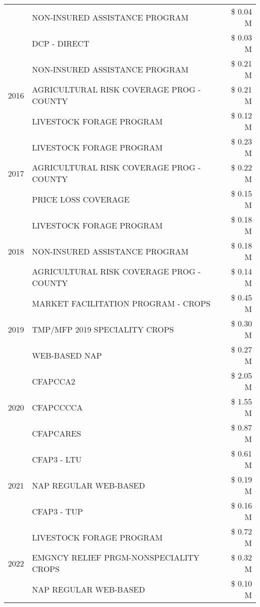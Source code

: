 \begin{tabular}{llr}
 & NON-INSURED ASSISTANCE PROGRAM & \$ 0.04 M \\
 & DCP - DIRECT & \$ 0.03 M \\
\cline{1-3}
\multirow[t]{3}{*}{2016} & NON-INSURED ASSISTANCE PROGRAM & \$ 0.21 M \\
 & AGRICULTURAL RISK COVERAGE PROG - COUNTY & \$ 0.21 M \\
 & LIVESTOCK FORAGE PROGRAM & \$ 0.12 M \\
\cline{1-3}
\multirow[t]{3}{*}{2017} & LIVESTOCK FORAGE PROGRAM & \$ 0.23 M \\
 & AGRICULTURAL RISK COVERAGE PROG - COUNTY & \$ 0.22 M \\
 & PRICE LOSS COVERAGE & \$ 0.15 M \\
\cline{1-3}
\multirow[t]{3}{*}{2018} & LIVESTOCK FORAGE PROGRAM & \$ 0.18 M \\
 & NON-INSURED ASSISTANCE PROGRAM & \$ 0.18 M \\
 & AGRICULTURAL RISK COVERAGE PROG - COUNTY & \$ 0.14 M \\
\cline{1-3}
\multirow[t]{3}{*}{2019} & MARKET FACILITATION PROGRAM - CROPS & \$ 0.45 M \\
 & TMP/MFP 2019 SPECIALITY CROPS & \$ 0.30 M \\
 & WEB-BASED NAP & \$ 0.27 M \\
\cline{1-3}
\multirow[t]{3}{*}{2020} & CFAPCCA2 & \$ 2.05 M \\
 & CFAPCCCCA & \$ 1.55 M \\
 & CFAPCARES & \$ 0.87 M \\
\cline{1-3}
\multirow[t]{3}{*}{2021} & CFAP3 - LTU & \$ 0.61 M \\
 & NAP REGULAR WEB-BASED & \$ 0.19 M \\
 & CFAP3 - TUP & \$ 0.16 M \\
\cline{1-3}
\multirow[t]{3}{*}{2022} & LIVESTOCK FORAGE PROGRAM & \$ 0.72 M \\
 & EMGNCY RELIEF PRGM-NONSPECIALITY CROPS & \$ 0.32 M \\
 & NAP REGULAR WEB-BASED & \$ 0.10 M \\
\cline{1-3}
\bottomrule
\end{tabular}

